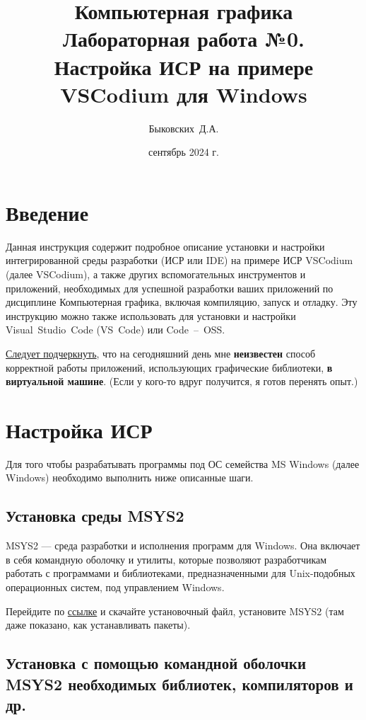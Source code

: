 \documentclass[a4paper,12pt]{article}
\author{Быковских~Д.А.}
\title{
    Компьютерная графика \\ 
    Лабораторная работа №0. \\ 
    Настройка ИСР на примере VSCodium для Windows
    }
\date{сентябрь 2024 г.}
\begin{document}
\fontsize{14pt}{16pt}\selectfont

\maketitle

\section{Введение}
Данная инструкция содержит подробное описание установки и настройки интегрированной среды разработки (ИСР или IDE) на примере ИСР VSCodium (далее VSCodium), а также других вспомогательных инструментов и приложений, необходимых для успешной разработки ваших приложений по дисциплине \textquotedbl Компьютерная графика\textquotedbl, включая компиляцию, запуск и отладку. Эту инструкцию можно также использовать для установки и настройки Visual~Studio~Code (VS~Code) или Code~--~OSS.

\underline{Следует подчеркнуть}, что на сегодняшний день мне \textbf{неизвестен} способ корректной работы приложений, использующих графические библиотеки, \textbf{в виртуальной машине}. (Если у кого-то вдруг получится, я готов перенять опыт.)

\section{Настройка ИСР}

Для того чтобы разрабатывать программы под ОС семейства MS Windows (далее Windows) необходимо выполнить ниже описанные шаги.

\subsection{Установка среды MSYS2}

MSYS2 --- среда разработки и исполнения программ для Windows. Она включает в себя командную оболочку и утилиты, которые позволяют разработчикам работать с программами и библиотеками, предназначенными для Unix-подобных операционных систем, под управлением Windows.

Перейдите по \href{https://www.msys2.org/}{ссылке} и скачайте установочный файл, установите MSYS2 (там даже показано, как устанавливать пакеты).


\subsection{Установка с помощью командной оболочки MSYS2 необходимых библиотек, компиляторов и др.}
\end{document}

